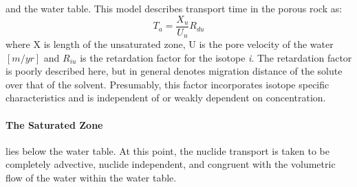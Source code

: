 and the water table. This model describes transport time in the porous rock as:
\begin{equation}
T_a= \frac{X_u}{U_u}R_{du}
\end{equation}
where X is length of the unsaturated zone, U is the pore velocity of the water $[m/yr]$ and $R_{iu}$ 
is the retardation factor for the isotope \emph{i}. The retardation factor is poorly described here, 
but in general denotes migration distance of the solute over that of the solvent. Presumably, this 
factor incorporates isotope specific characteristics and is independent of or weakly dependent on 
concentration.  \paragraph{The Saturated Zone} lies below the water table. At this point, the 
nuclide transport is taken to be completely advective, nuclide independent, and congruent with the 
volumetric flow of the water within the water table. 

